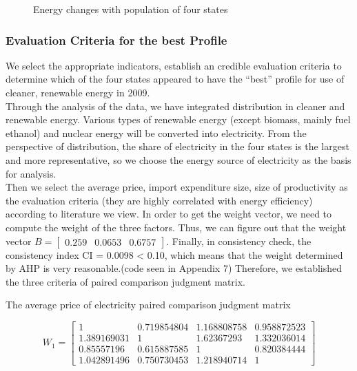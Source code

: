 \begin{itemize}
\begin{figure}[h]
{\begin{minipage}{7cm}
		\end{minipage}}
		\caption{Energy changes with population of four states}                      %
		\label{fig:Population}                                       %
	\end{figure}
\end{itemize}
\subsubsection{Evaluation Criteria for the best Profile}
We select the appropriate indicators, establish an credible evaluation criteria to determine which of the four states appeared to have the “best” profile for use of cleaner, renewable energy in 2009.\\
Through the analysis of the data, we have integrated distribution in cleaner and renewable energy. Various types of renewable energy (except biomass, mainly fuel ethanol) and nuclear energy will be converted into electricity.
From the perspective of distribution, the share of electricity in the four states is the largest and more representative, so we choose the energy source of electricity as the basis for analysis.\\ Then we select the average price, import expenditure size, size of productivity as the evaluation criteria (they are highly correlated with energy efficiency) according to literature we view.\cite{evaluation}
In order to get the weight vector, we need to compute the weight of the
three factors.
Thus, we can figure out that the weight vector  $ B=\begin{bmatrix}
0.259&0.0653&0.6757
\end{bmatrix}  $.
Finally, in consistency check, the consistency index CI =  0.0098 < 0.10, which
means that the weight determined by AHP is very reasonable.\cite{AHP}(code seen in Appendix 7)
Therefore, we established the three criteria of paired comparison judgment matrix.\\
\begin{center}
	The average price of electricity paired comparison judgment matrix
\end{center}
\[W_{1}= \begin{bmatrix}
1	& 	0.719854804		& 1.168808758	& 	0.958872523\\
1.389169031		& 1		& 1.62367293	& 	1.332036014\\
0.85557196	& 	0.615887585	& 	1	& 	0.820384444\\
1.042891496	& 	0.750730453	& 	1.218940714		& 1
\end{bmatrix} 
\]
